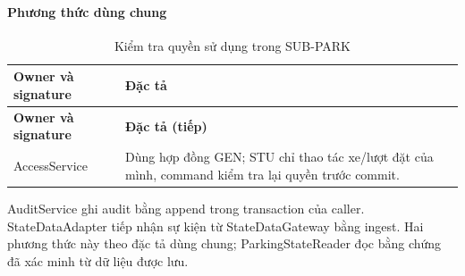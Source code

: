 \paragraph{Phương thức dùng chung}
\begin{longtable}{|L{58mm}|L{81mm}|}
\caption{Kiểm tra quyền sử dụng trong SUB-PARK}\\\hline
\textbf{Owner và signature} & \textbf{Đặc tả}\\\hline
\endfirsthead
\hline\textbf{Owner và signature} & \textbf{Đặc tả (tiếp)}\\\hline\endhead
AccessService\par{} &
Dùng hợp đồng GEN; STU chỉ thao tác xe/lượt đặt của mình, command kiểm tra lại quyền trước commit.\\\hline
\end{longtable}
AuditService ghi audit bằng append trong transaction của caller. StateDataAdapter tiếp nhận sự kiện từ StateDataGateway bằng ingest. Hai phương thức này theo đặc tả dùng chung; ParkingStateReader đọc bằng chứng đã xác minh từ dữ liệu được lưu.
